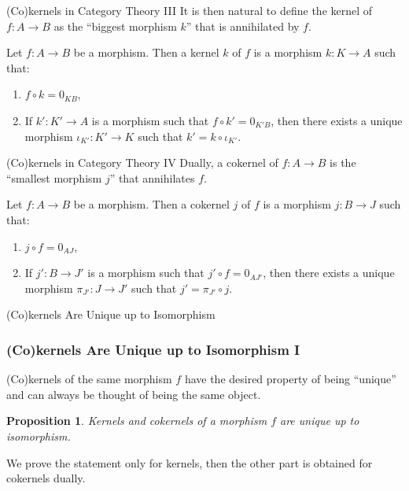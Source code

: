 \documentclass{beamer}
\newtheorem{proposition}{Proposition}
\begin{document}
\begin{frame}{(Co)kernels in Category Theory III}
    It is then natural to define the kernel of $f : A \to B$ as the ``biggest morphism $k$''
    that is annihilated by $f$. \medskip

    \begin{definition}
        Let $f : A \to B$ be a morphism. Then a kernel $k$ of $f$ is a morphism
        $k : K \to A$ such that:
        \begin{enumerate}
            \item $f \circ k = 0_{KB}$,
            \item If $k' : K' \to A$ is a morphism such that $f \circ k' = 0_{K'B}$, then
                there exists a unique morphism $\iota_{K'} : K' \to K$ such that
                $k' = k \circ \iota_{K'}$.
        \end{enumerate}
    \end{definition}
\end{frame}

\begin{frame}{(Co)kernels in Category Theory IV}
    Dually, a cokernel of $f : A \to B$ is the ``smallest morphism $j$'' that
    annihilates $f$. \medskip

    \begin{definition}
        Let $f : A \to B$ be a morphism. Then a cokernel $j$ of $f$ is a morphism
        $j : B \to J$ such that:
        \begin{enumerate}
            \item $j \circ f = 0_{AJ}$,
            \item If $j' : B \to J'$ is a morphism such that $j' \circ f = 0_{AJ'}$, then
                there exists a unique morphism $\pi_{J'} : J \to J'$ such that
                $j' = \pi_{J'} \circ j$.
        \end{enumerate}
    \end{definition}
\end{frame}

\begin{frame}{(Co)kernels Are Unique up to Isomorphism}
    \frametitle{(Co)kernels Are Unique up to Isomorphism I}
    (Co)kernels of the same morphism $f$
    have the desired property of being ``unique'' and can always be thought
    of being the same object. \medskip

    \begin{proposition}
        \label{prop:kernels_unique_up_to_iso}
        Kernels and cokernels of a morphism $f$ are unique up to isomorphism.
    \end{proposition}

    We prove the statement only for kernels, then the other part is obtained for
    cokernels dually. \medskip
\end{frame}
\end{document}
